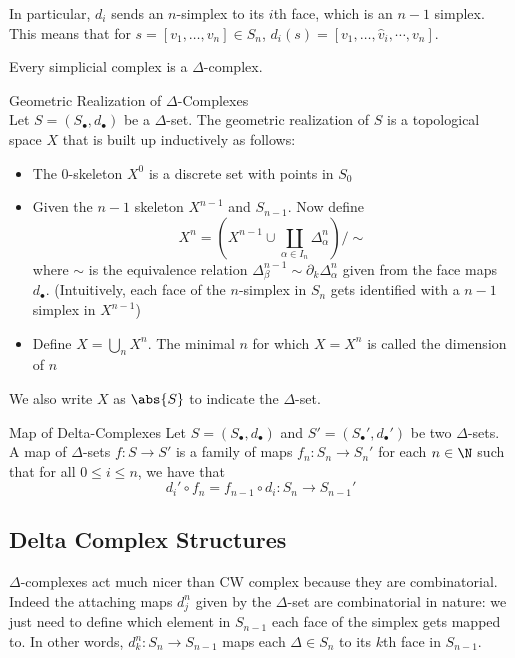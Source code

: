 \documentclass[a4paper]{article}
\begin{document}
In particular, $d_i$ sends an $n$-simplex to its $i$th face, which is an $n-1$ simplex. This means that for $s=[v_1,\dots,v_n]\in S_n$, $d_i(s)=[v_1,\dots,\hat{v}_i,\cdots,v_n]$. 

\begin{prp}{}{} Every simplicial complex is a $\Delta$-complex. 
\end{prp}

\begin{defn}{Geometric Realization of $\Delta$-Complexes}{}\\
Let $S=(S_\bullet,d_\bullet)$ be a $\Delta$-set. The geometric realization of $S$ is a topological space $X$ that is built up inductively as follows: 
\begin{itemize}
\item The $0$-skeleton $X^0$ is a discrete set with points in $S_0$
\item Given the $n-1$ skeleton $X^{n-1}$ and $S_{n-1}$. Now define $$X^n=\left(X^{n-1}\cup\coprod_{\alpha\in I_n}\Delta_\alpha^n\right)/\sim$$ where $\sim$ is the equivalence relation $\Delta_\beta^{n-1}\sim\partial_k\Delta_\alpha^n$ given from the face maps $d_\bullet$. (Intuitively, each face of the $n$-simplex in $S_n$ gets identified with a $n-1$ simplex in $X^{n-1}$)
\item Define $X=\bigcup_nX^n$. The minimal $n$ for which $X=X^n$ is called the dimension of $n$
\end{itemize}
We also write $X$ as $\abs{S}$ to indicate the $\Delta$-set. 
\end{defn}

\begin{defn}{Map of Delta-Complexes}{} Let $S=(S_\bullet,d_\bullet)$ and $S'=(S_\bullet',d_\bullet')$ be two $\Delta$-sets. A map of $\Delta$-sets $f:S\to S'$ is a family of maps $f_n:S_n\to S_n'$ for each $n\in\N$ such that for all $0\leq i\leq n$, we have that $$d_i'\circ f_n=f_{n-1}\circ d_i:S_n\to S_{n-1}'$$
\end{defn}

\subsection{Delta Complex Structures}
$\Delta$-complexes act much nicer than CW complex because they are combinatorial. Indeed the attaching maps $d_j^n$ given by the $\Delta$-set are combinatorial in nature: we just need to define which element in $S_{n-1}$ each face of the simplex gets mapped to. In other words, $d_k^n:S_n\to S_{n-1}$ maps each $\Delta\in S_n$ to its $k$th face in $S_{n-1}$. 
\end{document}
